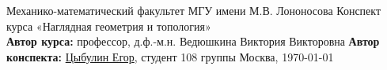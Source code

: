 \documentclass[a4paper, 12pt, openany]{book}
\theoremstyle{plain}
\theoremstyle{definition}
\theoremstyle{remark}
\begin{document}
\begin{titlepage}
    \begin{center}
        \large Механико-математический факультет МГУ имени М.В. Лононосова
        \vfill
        \Large Конспект курса «Наглядная геометрия и топология» \bigskip \\
        \large \textbf{Автор курса:} профессор, д.ф.-м.н. Ведюшкина Виктория Викторовна
        \textbf{Автор конспекта:} \href{https://github.com/betel-git}{Цыбулин Егор}, студент 108 группы
        \vfill
        Москва, \today
    \end{center}
\end{titlepage}
\tableofcontents

\fontsize{14pt}{20pt}\selectfont


\end{document}
